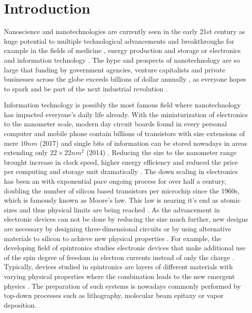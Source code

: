 \documentclass[\main/dresen_thesis.tex]{subfiles}
\begin{document}
\chapter{Introduction}\label{ch:introduction}
  Nanoscience and nanotechnologies are currently seen in the early 21st century as huge potential to multiple technological advancements and breakthroughs for example in the fields of medicine \cite{Popat_2011_Nanot, Thanh_2012_Magne}, energy production and storage \cite{Huebler_2009_Digit, Shinn_2012_Nucle} or electronics and information technology \cite{Waser_2012_Nanoe, Duart_2006_Nanot}.
  The hype and prospects of nanotechnology are so large that funding by government agencies, venture capitalists and private businesses across the globe exceeds billions of dollar annually \cite{McCray_2005_Wills}, as everyone hopes to spark and be part of the next industrial revolution \cite{Guston_2010_Encyc}.

  Information technology is possibly the most famous field where nanotechnology has impacted everyone's daily life already.
  With the miniaturization of electronics to the nanometer scale, modern day circuit boards found in every personal computer and mobile phone contain billions of transistors with size extensions of mere $10 \unit{nm}$ (2017) \cite{Courtland_2017_Moores} and single bits of information can be stored nowadays in areas extending only $22 \times 22 \unit{nm^2}$ (2014) \cite{Fontana_2015_Volum}.
  Reducing the size to the nanometer range brought increase in clock speed, higher energy efficiency and reduced the price per computing  and storage unit dramatically \cite{Courtland_2017_Moores}.
  The down scaling in electronics has been an with exponential pace ongoing process for over half a century, doubling the number of silicon based transistors per microchip since the 1960s, which is famously known as Moore's law.
  This law is nearing it's end as atomic sizes and thus physical limits are being reached \cite{Waldrop_2016_Moret}.
  As the advancement in electronic devices can not be done by reducing the size much further, new designs are necessary \ie by designing three-dimensional circuits or by using alternative materials to silicon to achieve new physical properties \cite{Waldrop_2016_Moret}.
  For example, the developing field of spintronics studies electronic devices that make additional use of the spin degree of freedom in electron currents instead of only the charge \cite{Wolf_2001_Spint}.
  Typically, devices studied in spintronics are layers of different materials with varying physical properties where the combination leads to the new emergent physics \cite{Zutic_2004_Spint}.
  The preparation of such systems is nowadays commonly performed by top-down processes such as lithography, molecular beam epitaxy or vapor deposition.
\end{document}
